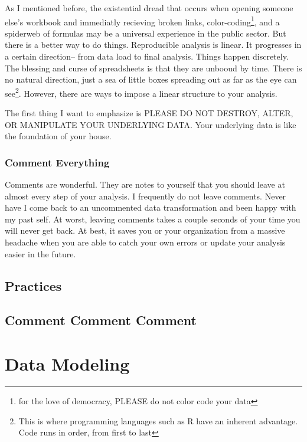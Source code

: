 \documentclass[]{book}
\begin{document}
As I mentioned before, the existential dread that occurs when opening someone else's workbook and immediatly recieving broken links, color-coding\footnote{for the love of democracy, PLEASE do not color code your data}, and a spiderweb of formulas may be a universal experience in the public sector. But there is a better way to do things. Reproducible analysis is linear. It progresses in a certain direction-- from data load to final analysis. Things happen discretely. The blessing and curse of spreadsheets is that they are unbooud by time. There is no natural direction, just a sea of little boxes spreading out as far as the eye can see\footnote{This is where programming languages such as R have an inherent advantage. Code runs in order, from first to last}. However, there are ways to impose a linear structure to your analysis.

The first thing I want to emphasize is PLEASE DO NOT DESTROY, ALTER, OR MANIPULATE YOUR UNDERLYING DATA. Your underlying data is like the foundation of your house.

\hypertarget{comment-everything}{%
\subsection{Comment Everything}\label{comment-everything}}

Comments are wonderful. They are notes to yourself that you should leave at almost every step of your analysis. I frequently do not leave comments. Never have I come back to an uncommented data transformation and been happy with my past self. At worst, leaving comments takes a couple seconds of your time you will never get back. At best, it saves you or your organization from a massive headache when you are able to catch your own errors or update your analysis easier in the future.

\hypertarget{practices}{%
\section{Practices}\label{practices}}

\hypertarget{comment-comment-comment}{%
\section{Comment Comment Comment}\label{comment-comment-comment}}

\hypertarget{data-modeling}{%
\chapter{Data Modeling}\label{data-modeling}}
\end{document}
